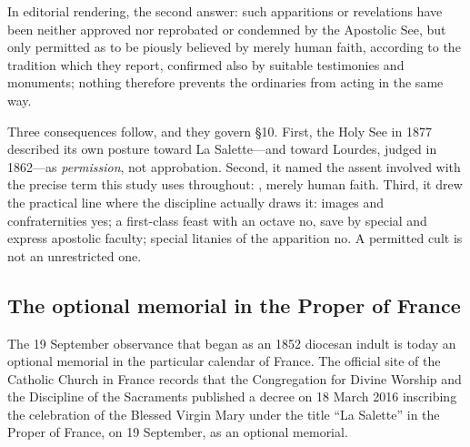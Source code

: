 In editorial rendering, the second answer: such apparitions or
revelations have been neither approved nor reprobated or condemned
by the Apostolic See, but only permitted as to be piously believed
by merely human faith, according to the tradition which they report,
confirmed also by suitable testimonies and monuments; nothing
therefore prevents the ordinaries from acting in the same way.

Three consequences follow, and they govern \S10. First, the Holy See
in 1877 described its own posture toward La Salette---and toward
Lourdes, judged in 1862---as \emph{permission}, not approbation.
Second, it named the assent involved with the precise term this
study uses throughout: , merely human
faith. Third, it drew the practical line where the discipline
actually draws it: images and confraternities yes; a first-class
feast with an octave no, save by special and express apostolic
faculty; special litanies of the apparition no. A permitted cult is
not an unrestricted one.

\subsection{The optional memorial in the Proper of France}

The 19 September observance that began as an 1852 diocesan indult is
today an optional memorial in the particular calendar of France. The
official site of the Catholic Church in France records that the
Congregation for Divine Worship and the Discipline of the Sacraments
published a decree on 18 March 2016 inscribing the celebration of
the Blessed Virgin Mary under the title ``La Salette'' in the Proper
of France, on 19 September, as an optional
memorial.

